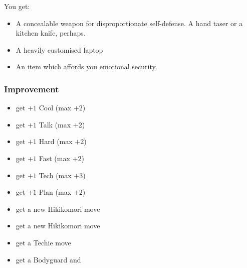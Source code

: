 You get:
\begin{itemize}
\item A concealable weapon for disproportionate self-defense. A hand taser or a kitchen knife, perhaps.
\item A heavily customised laptop
\item An item which affords you emotional security.
\end{itemize}

\subsubsection{Improvement}
\begin{itemize}
\item get $+1$ Cool (max $+2$)
\item get $+1$ Talk (max $+2$)
\item get $+1$ Hard (max $+2$)
\item get $+1$ Fast (max $+2$)
\item get $+1$ Tech (max $+3$)
\item get $+1$ Plan (max $+2$)
\item get a new Hikikomori move
\item get a new Hikikomori move
\item get a Techie move
\item get a Bodyguard and 
\end{itemize}